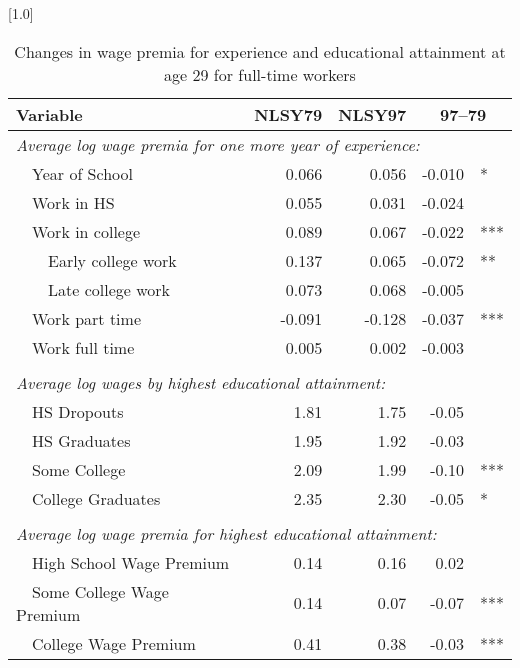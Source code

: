 \begin{table}[ht]
\caption{Changes in wage premia for experience and educational attainment at age 29 for full-time workers}
\label{tab:wagepremia}
\centering
\scalebox{1.0}[1.0]{%
\begin{threeparttable}
\begin{tabular}{lrrr@{}l}
\toprule 
Variable & NLSY79 & NLSY97 & \multicolumn{2}{c}{97--79} \\
\midrule 
\multicolumn{5}{l}{\emph{Average log wage premia for one more year of experience:}} \\
~~Year of School    & 0.066 & 0.056 & -0.010 &   * \\ 
~~Work in HS        & 0.055 & 0.031 & -0.024 &       \\ 
~~Work in college   & 0.089 & 0.067 & -0.022 & *** \\ 
~~~~Early college work & 0.137 & 0.065 & -0.072 & ** \\ 
~~~~Late college work  & 0.073 & 0.068 & -0.005 &   \\ 
~~Work part time    & -0.091 & -0.128 & -0.037 &  *** \\ 
~~Work full time    & 0.005 & 0.002 & -0.003 &    \\ 
\vspace{-6pt}  \\
\multicolumn{5}{l}{\emph{Average log wages by highest educational attainment:}} \\
~~HS Dropouts        & 1.81 & 1.75 & -0.05 &    \\ 
~~HS Graduates       & 1.95 & 1.92 & -0.03 &    \\ 
~~Some College       & 2.09 & 1.99 & -0.10 &  *** \\ 
~~College Graduates  & 2.35 & 2.30 & -0.05 &  * \\ 
\vspace{-6pt}  \\
\multicolumn{5}{l}{\emph{Average log wage premia for highest educational attainment:}} \\
~~High School Wage Premium   & 0.14 & 0.16 & 0.02 &    \\ 
~~Some College Wage Premium  & 0.14 & 0.07 & -0.07 &  *** \\ 
~~College Wage Premium       & 0.41 & 0.38 & -0.03 &   *** \\ 
\bottomrule 

\end{tabular}
\end{threeparttable}}
\end{table}
